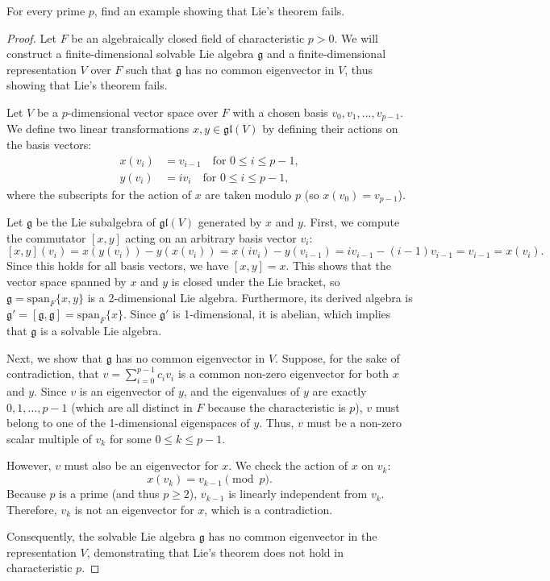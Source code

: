 \begin{exercise}
    For every prime $p$, find an example showing that Lie's theorem fails.
\end{exercise}

\begin{proof}
    Let $F$ be an algebraically closed field of characteristic $p > 0$. We will construct a finite-dimensional solvable Lie algebra $\mathfrak{g}$ and a finite-dimensional representation $V$ over $F$ such that $\mathfrak{g}$ has no common eigenvector in $V$, thus showing that Lie's theorem fails.

    Let $V$ be a $p$-dimensional vector space over $F$ with a chosen basis $v_0, v_1, \dots, v_{p-1}$.
    We define two linear transformations $x, y \in \mathfrak{gl}(V)$ by defining their actions on the basis vectors:
    \begin{align*}
        x(v_i) & = v_{i-1} \quad \text{for } 0 \le i \le p-1, \\
        y(v_i) & = i v_i \quad \text{for } 0 \le i \le p-1,
    \end{align*}
    where the subscripts for the action of $x$ are taken modulo $p$ (so $x(v_0) = v_{p-1}$).

    Let $\mathfrak{g}$ be the Lie subalgebra of $\mathfrak{gl}(V)$ generated by $x$ and $y$. First, we compute the commutator $[x, y]$ acting on an arbitrary basis vector $v_i$:
    \[
        [x, y](v_i) = x(y(v_i)) - y(x(v_i)) = x(i v_i) - y(v_{i-1}) = i v_{i-1} - (i-1) v_{i-1} = v_{i-1} = x(v_i).
    \]
    Since this holds for all basis vectors, we have $[x, y] = x$.
    This shows that the vector space spanned by $x$ and $y$ is closed under the Lie bracket, so $\mathfrak{g} = \text{span}_F\{x, y\}$ is a 2-dimensional Lie algebra.
    Furthermore, its derived algebra is $\mathfrak{g}' = [\mathfrak{g}, \mathfrak{g}] = \text{span}_F\{x\}$. Since $\mathfrak{g}'$ is 1-dimensional, it is abelian, which implies that $\mathfrak{g}$ is a solvable Lie algebra.

    Next, we show that $\mathfrak{g}$ has no common eigenvector in $V$.
    Suppose, for the sake of contradiction, that $v = \sum_{i=0}^{p-1} c_i v_i$ is a common non-zero eigenvector for both $x$ and $y$.
    Since $v$ is an eigenvector of $y$, and the eigenvalues of $y$ are exactly $0, 1, \dots, p-1$ (which are all distinct in $F$ because the characteristic is $p$), $v$ must belong to one of the 1-dimensional eigenspaces of $y$.
    Thus, $v$ must be a non-zero scalar multiple of $v_k$ for some $0 \le k \le p-1$.

    However, $v$ must also be an eigenvector for $x$. We check the action of $x$ on $v_k$:
    \[
        x(v_k) = v_{k-1} \pmod p.
    \]
    Because $p$ is a prime (and thus $p \ge 2$), $v_{k-1}$ is linearly independent from $v_k$. Therefore, $v_k$ is not an eigenvector for $x$, which is a contradiction.

    Consequently, the solvable Lie algebra $\mathfrak{g}$ has no common eigenvector in the representation $V$, demonstrating that Lie's theorem does not hold in characteristic $p$.
\end{proof}

